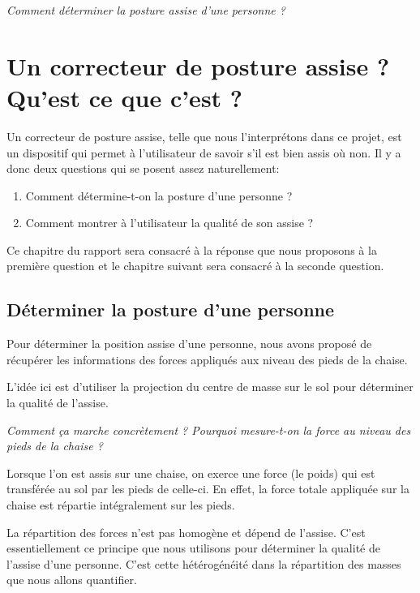 \documentclass{polytech/polytech}
\begin{document}
\begin{center}
\textit{Comment déterminer la posture assise d'une personne ? }
\end{center}

\chapter{Un correcteur de posture assise ? Qu'est ce que c'est ?}
\label{chap:correcteur posture}

Un correcteur de posture assise, telle que nous l'interprétons dans ce projet, est un dispositif qui permet à l'utilisateur de savoir s'il est bien assis où non. Il y a donc deux questions qui se posent assez naturellement:

\begin{enumerate}
\item Comment détermine-t-on la posture d'une personne ?
\item Comment montrer à l'utilisateur la qualité de son assise ?
\end{enumerate}

Ce chapitre du rapport sera consacré à la réponse que nous proposons à la première question et le chapitre suivant sera consacré à la seconde question.

\section{Déterminer la posture d'une personne}
\label{chap:posture_determination}

Pour déterminer la position assise d'une personne, nous avons proposé de récupérer les informations des forces appliqués aux niveau des pieds de la chaise. 

L'idée ici est d'utiliser la projection du centre de masse sur le sol pour déterminer la qualité de l'assise. 

\begin{center}
\textit{Comment ça marche concrètement ? Pourquoi mesure-t-on la force au niveau des pieds de la chaise ?} 
\end{center}

Lorsque l'on est assis sur une chaise, on exerce une force (le poids) qui est transférée au sol par les pieds de celle-ci. En effet, la force totale appliquée sur la chaise est répartie intégralement sur les pieds.

La répartition des forces n'est pas homogène et dépend de l'assise. C'est essentiellement ce principe que nous utilisons pour déterminer la qualité de l'assise d'une personne. C'est cette hétérogénéité dans la répartition des masses que nous allons quantifier.
\end{document}
